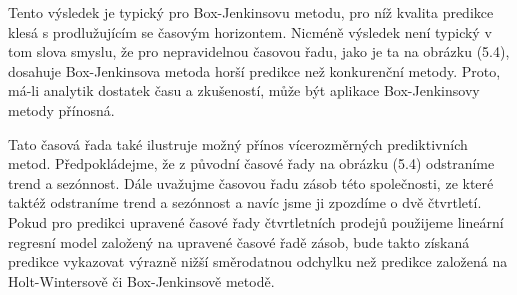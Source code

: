 Tento výsledek je typický pro Box-Jenkinsovu metodu, pro níž kvalita predikce klesá s prodlužujícím se časovým horizontem. Nicméně výsledek není typický v tom slova smyslu, že pro nepravidelnou časovou řadu, jako je ta na obrázku (5.4), dosahuje Box-Jenkinsova metoda horší predikce než konkurenční metody. Proto, má-li analytik dostatek času a zkušeností, může být aplikace Box-Jenkinsovy metody přínosná.

Tato časová řada také ilustruje možný přínos vícerozměrných prediktivních metod. Předpokládejme, že z původní časové řady na obrázku (5.4) odstraníme trend a sezónnost. Dále uvažujme časovou řadu zásob této společnosti, ze které taktéž odstraníme trend a sezónnost a navíc jsme ji zpozdíme o dvě čtvrtletí. Pokud pro predikci upravené časové řady čtvrtletních prodejů
použijeme lineární regresní model založený na upravené časové řadě zásob, bude takto získaná predikce vykazovat výrazně nižší směrodatnou odchylku než predikce založená na Holt-Wintersově či Box-Jenkinsově metodě.

